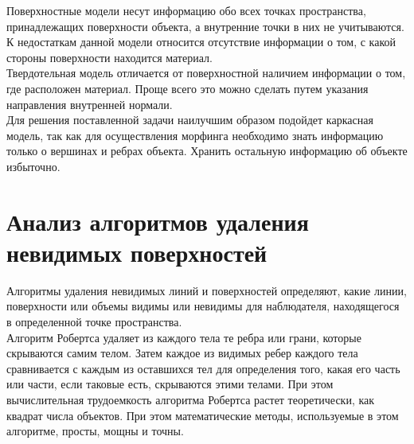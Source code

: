 Поверхностные модели несут информацию обо всех точках
пространства, принадлежащих поверхности объекта, а внутренние точки в них
не учитываются. К недостаткам данной модели относится отсутствие информации о том, с какой стороны поверхности находится материал.\\ %


Твердотельная модель отличается от поверхностной наличием информации о том, где расположен материал. Проще всего это можно сделать путем указания направления внутренней нормали.\cite{Kosnikov}\\


Для решения поставленной задачи наилучшим образом подойдет каркасная модель, так как для осуществления морфинга необходимо знать информацию только о вершинах и ребрах объекта. Хранить остальную информацию об объекте избыточно. 

\newpage

\section{Анализ алгоритмов удаления невидимых поверхностей}

Алгоритмы удаления невидимых линий и поверхностей определяют, какие линии, поверхности или объемы видимы или невидимы для наблюдателя, находящегося в определенной точке пространства.\\


Алгоритм Робертса удаляет из каждого тела те ребра или грани, которые скрываются самим телом. Затем каждое из видимых ребер каждого тела сравнивается с каждым из оставшихся тел для определения того, какая его часть или части, если таковые есть, скрываются этими телами. При этом вычислительная трудоемкость алгоритма Робертса растет теоретически, как квадрат числа объектов. При этом математические методы, используемые в этом алгоритме, просты, мощны и точны.\\ %

